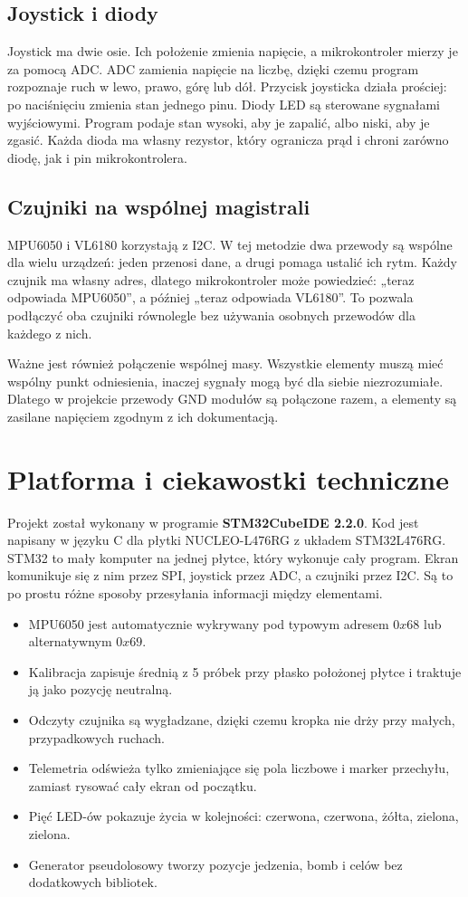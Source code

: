 \documentclass[12pt,a4paper]{article}
\newcommand{\sectiontitle}[1]{%
    \section*{#1}
}
\begin{document}
\subsection*{Joystick i diody}

Joystick ma dwie osie. Ich położenie zmienia napięcie, a mikrokontroler
mierzy je za pomocą ADC. ADC zamienia napięcie na liczbę, dzięki czemu
program rozpoznaje ruch w lewo, prawo, górę lub dół. Przycisk joysticka
działa prościej: po naciśnięciu zmienia stan jednego pinu. Diody LED są
sterowane sygnałami wyjściowymi. Program podaje stan wysoki, aby je zapalić,
albo niski, aby je zgasić. Każda dioda ma własny rezystor, który ogranicza
prąd i chroni zarówno diodę, jak i pin mikrokontrolera.

\subsection*{Czujniki na wspólnej magistrali}

MPU6050 i VL6180 korzystają z I2C. W tej metodzie dwa przewody są wspólne
dla wielu urządzeń: jeden przenosi dane, a drugi pomaga ustalić ich rytm.
Każdy czujnik ma własny adres, dlatego mikrokontroler może powiedzieć:
„teraz odpowiada MPU6050”, a później „teraz odpowiada VL6180”. To pozwala
podłączyć oba czujniki równolegle bez używania osobnych przewodów dla
każdego z nich.

Ważne jest również połączenie wspólnej masy. Wszystkie elementy muszą mieć
wspólny punkt odniesienia, inaczej sygnały mogą być dla siebie
niezrozumiałe. Dlatego w projekcie przewody GND modułów są połączone razem,
a elementy są zasilane napięciem zgodnym z ich dokumentacją.

\sectiontitle{Platforma i ciekawostki techniczne}

Projekt został wykonany w programie \textbf{STM32CubeIDE 2.2.0}. Kod jest
napisany w języku C dla płytki NUCLEO-L476RG z układem STM32L476RG.
STM32 to mały komputer na jednej płytce, który wykonuje cały program.
Ekran komunikuje się z nim przez SPI, joystick przez ADC, a czujniki przez
I2C. Są to po prostu różne sposoby przesyłania informacji między elementami.

\begin{itemize}
    \item MPU6050 jest automatycznie wykrywany pod typowym adresem $0x68$
    lub alternatywnym $0x69$.
    \item Kalibracja zapisuje średnią z 5 próbek przy płasko położonej
    płytce i traktuje ją jako pozycję neutralną.
    \item Odczyty czujnika są wygładzane, dzięki czemu kropka nie drży
    przy małych, przypadkowych ruchach.
    \item Telemetria odświeża tylko zmieniające się pola liczbowe i marker
    przechyłu, zamiast rysować cały ekran od początku.
    \item Pięć LED-ów pokazuje życia w kolejności: czerwona, czerwona,
    żółta, zielona, zielona.
    \item Generator pseudolosowy tworzy pozycje jedzenia, bomb i celów bez
    dodatkowych bibliotek.
\end{itemize}
\end{document}
